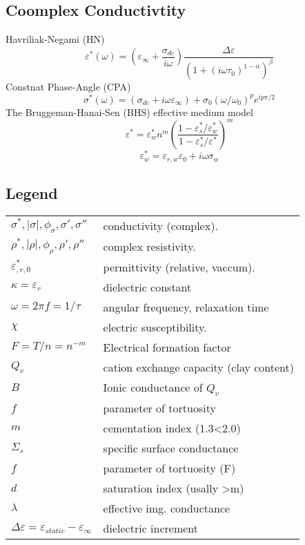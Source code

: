 \documentclass[twocolumn]{article}
\begin{document}
\subsection{Coomplex Conductivtity}
Havriliak-Negami (HN)
\[ \varepsilon^*(\omega) = \left( \varepsilon_\infty + \frac{\sigma_{dc}}{i\omega}\right) \frac{\Delta \varepsilon}{ \left( 1+\left( i \omega \tau_0\right) ^{1-\alpha} \right) ^{\beta} } \]
Constnat Phase-Angle (CPA)
\[ \sigma^*(\omega)=(\sigma_{dc}+i\omega \varepsilon_\infty) + \sigma_0(\omega/\omega_0)^p e^{ip\pi/2} \]
The Bruggeman-Hanai-Sen (BHS) effective medium model
\[ \varepsilon^*=\varepsilon_w^*n^m\left(\frac{1-\varepsilon_s^*/\varepsilon_w^*}{1-\varepsilon_s^*/\varepsilon^*}\right)^m\]
\[\varepsilon_w^*=\varepsilon_{r,w}\varepsilon_0 + i\omega\sigma_w\]
\subsection{Legend}
\begin{tabular}{@{}ll@{}}
$\sigma^*,|\sigma|,\phi_\sigma,\sigma',\sigma''$	& conductivity (complex). \\
$\rho^*,|\rho|,\phi_\rho,\rho',\rho''$  			& complex resistivity. \\
$\varepsilon_{,r,0}^*$ 								& permittivity (relative, vaccum). \\
$\kappa =\varepsilon_r$ 							& dielectric constant\\
$\omega=2\pi f =1/\tau$  						& angular frequency, relaxation time \\
$\chi$ 											& electric susceptibility.\\
$F=T/n = n^{-m}$ 								& Electrical formation factor\\
$Q_v$ 											& cation exchange capacity (clay content)\\
$B$ 												& Ionic conductance of $Q_v$\\
$f$ 												& parameter of tortuosity\\
$m$ 												& cementation index (1.3<2.0)\\
$\Sigma_s$ 										& specific surface conductance\\
$f$ 												& parameter of tortuosity (F)\\
$d$ 												& saturation index (usally >m)\\
$\lambda$ 										& effective img. conductance\\
$\Delta \varepsilon = \varepsilon_{static} -\varepsilon_\infty$ & dielectric increment
\end{tabular}
\end{document}
